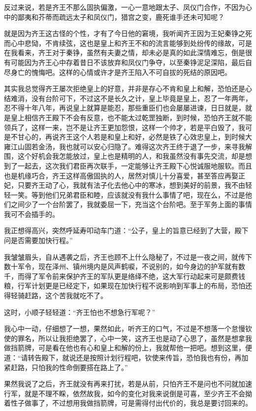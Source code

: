 反过来说，若是齐王不那么固执偏激，一心一意地跟太子、凤仪门合作，不因为心中的鄙夷和芥蒂而疏远太子和凤仪门，猎宫之变，鹿死谁手还未可知呢？

就是因为齐王这古怪的个性，才有了今日他的窘境，我听闻齐王因为王妃秦铮之死而心中悲恸，不肯续弦，这也是皇上和齐王不和的流言能够到处纷传的缘故，可是在我看来，齐王对于秦铮，虽然有夫妻之情，却未必是真的如此深情难忘，倒是很有可能因为齐王心中存着昔日不该放弃和凤仪门争夺，以至秦铮泥足深陷，最后自尽身亡的愧悔吧。这样的心情或许才是齐王陷入不可自拔的死结的原因吧。

其实我总觉得齐王屡次拒绝皇上的好意，并非是存心不肯和皇上和解，恐怕还是心结难消，没有台阶可下，不过这不是长久之计，皇上毕竟是皇上，忍了一年两年，忍不得十年八年，再说皇上就算是能忍，那些重臣们也会屡屡进谏，日日就是，就是皇上相信齐王殿下不会有反意，也不能太过乾罡独断，到时候，恐怕齐王就不能领兵了，这样一来，岂不是让齐王更加怨恨，这样一个帅才，若是平白毁了，我可是不甘心的，再说齐王这个人若是和皇上和好，必然是铁了心效忠皇上，到时候大雍江山固若金汤，我也就可以安心归隐了。难得这次齐王终于退了一步，来寻我解围，这个好机会我怎能放过，皇上也是精明的人，和我虽然没有事先交流，却是想到了一起去，这次我们君臣再次联手，一定能够让齐王殿下心悦诚服地服软。而且也是机缘巧合，齐王这样高傲固执的人，居然对慎儿十分喜爱，甚至答应再娶正妃，只要齐王动了心，我就有法子化去他心中的寒冰，想到美好的前景，我不由轻轻一笑。等到他们兄弟君臣和睦，应该就没有我什么事情了吧，现在么，不过是他们之间少了一个台阶罢了，我就委屈一下，充当这个台阶吧。至于军务上面的事情我可不会插手的。

我正想得高兴，突然呼延寿叩动车门道：“公子，皇上的旨意已经到了大营，殿下问是否需要加快行程。”

我皱皱眉头，自从遇袭之后，齐王也顾不上什么隐秘了，不过是一夜之间，就传下数十军令，现在泽州、镇州境内是风声鹤唳，不说别的，如今身边的护军就有数千，而得了军令前来保护齐王的军队更是络绎不绝，这大军行动起来可是颇费钱粮，行军计划更是已经定下，如果现在加快行程不说影响到军事上的布局，恐怕还得轻骑赶路，这个苦我就吃不了。

这时，小顺子轻轻道：“齐王怕也不想急行军呢？”

我心中一动，仔细想了一想，果然如此，听齐王的口气，不过是不想落一个怠慢钦使的罪名，所以让我拒绝罢了，心中一笑，这齐王也是动了心思了，虽然是想拿我做挡箭牌，可是看在他也有心和皇上和解的份上，我就帮他一把吧。想到这里，便道：“请转告殿下，就说还是按照计划行程吧，钦使来传旨，恐怕我也有份，再加紧赶路，只怕我的性命倒要搭在路上了。”

果然我说了之后，齐王就没有再来打扰，若是从前，只怕齐王不是问也不问就加速行军，就是不理不睬，依然故我，如今的变化对我来说倒是可喜，至少齐王不会拗着性子做事了，不过想用我做挡箭牌，可是需得付出代价的，我总是要讨回来的。


